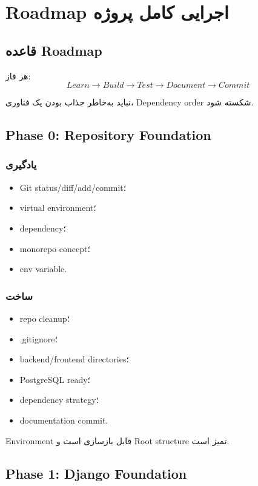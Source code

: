 
\chapter{Roadmap اجرایی کامل پروژه}

\section{قاعده Roadmap}

هر فاز:
\[
Learn \rightarrow Build \rightarrow Test \rightarrow Document \rightarrow Commit
\]

نباید به‌خاطر جذاب بودن یک فناوری، Dependency order شکسته شود.

\section{Phase 0: Repository Foundation}

\subsection*{یادگیری}
\begin{itemize}
  \item Git status/diff/add/commit؛
  \item virtual environment؛
  \item dependency؛
  \item monorepo concept؛
  \item env variable.
\end{itemize}

\subsection*{ساخت}
\begin{itemize}
  \item repo cleanup؛
  \item .gitignore؛
  \item backend/frontend directories؛
  \item PostgreSQL ready؛
  \item dependency strategy؛
  \item documentation commit.
\end{itemize}

\begin{donebox}
Environment قابل بازسازی است و Root structure تمیز است.
\end{donebox}

\section{Phase 1: Django Foundation}

